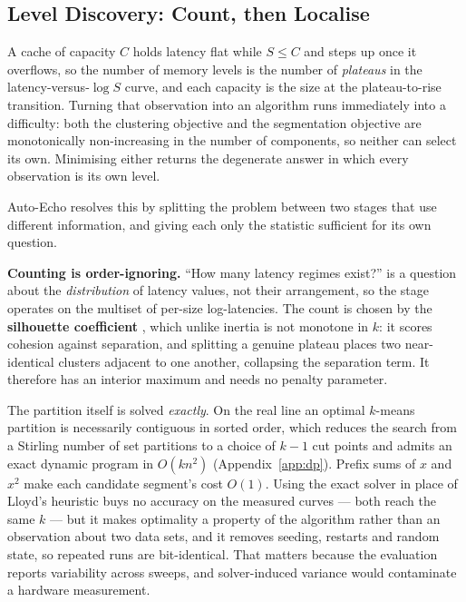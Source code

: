 \documentclass[conference]{IEEEtran}
\begin{document}
\subsection{Level Discovery: Count, then Localise}

A cache of capacity $C$ holds latency flat while $S \leq C$ and steps up once it
overflows, so the number of memory levels is the number of \emph{plateaus} in the
latency-versus-$\log S$ curve, and each capacity is the size at the
plateau-to-rise transition. Turning that observation into an algorithm runs
immediately into a difficulty: both the clustering objective and the segmentation
objective are monotonically non-increasing in the number of components, so
neither can select its own. Minimising either returns the degenerate answer in
which every observation is its own level.

Auto-Echo resolves this by splitting the problem between two stages that use
different information, and giving each only the statistic sufficient for its own
question.

\textbf{Counting is order-ignoring.} ``How many latency regimes exist?'' is a
question about the \emph{distribution} of latency values, not their arrangement,
so the stage operates on the multiset of per-size log-latencies. The count is
chosen by the \textbf{silhouette coefficient} \citep{rousseeuw1987}, which unlike inertia is not
monotone in $k$: it scores cohesion against separation, and splitting a genuine
plateau places two near-identical clusters adjacent to one another, collapsing the
separation term. It therefore has an interior maximum and needs no penalty
parameter.

The partition itself is solved \emph{exactly}. On the real line an optimal
$k$-means partition is necessarily contiguous in sorted order, which reduces the
search from a Stirling number of set partitions to a choice of $k-1$ cut points
and admits an exact dynamic program in $O(kn^2)$ \citep{fisher1958,wang2011}
(Appendix~\ref{app:dp}). Prefix
sums of $x$ and $x^2$ make each candidate segment's cost $O(1)$. Using the exact
solver in place of Lloyd's heuristic \citep{lloyd1982} buys no accuracy on the measured curves ---
both reach the same $k$ --- but it makes optimality a property of the algorithm
rather than an observation about two data sets, and it removes seeding, restarts
and random state, so repeated runs are bit-identical. That matters because the
evaluation reports variability across sweeps, and solver-induced variance would
contaminate a hardware measurement.
\end{document}
